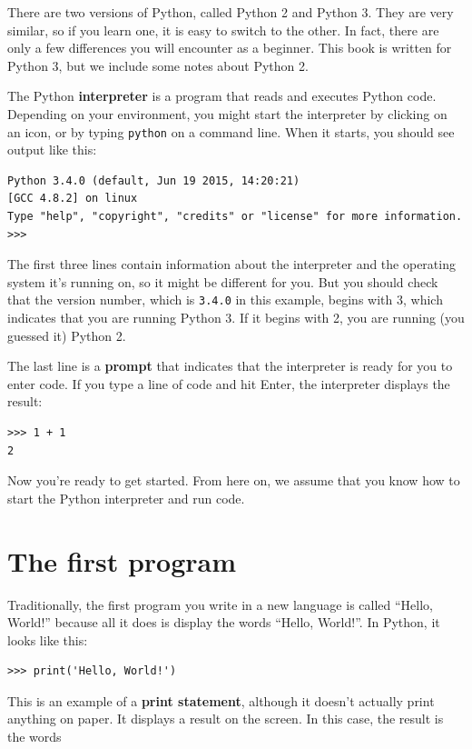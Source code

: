 There are two versions of Python, called Python 2 and Python 3.
They are very similar, so if you learn one, it is easy to switch
to the other. In fact, there are only a few differences you will
encounter as a beginner.
This book is written for Python 3, but we include some notes
about Python 2.

The Python {\bf interpreter} is a program that reads and executes
Python code. Depending on your environment, you might start the
interpreter by clicking on an icon, or by typing {\tt python} on
a command line. 
When it starts, you should see output like this:

\begin{verbatim}
Python 3.4.0 (default, Jun 19 2015, 14:20:21) 
[GCC 4.8.2] on linux
Type "help", "copyright", "credits" or "license" for more information.
>>> 
\end{verbatim}
%
The first three lines contain information about the interpreter
and the operating system it's running on, so it might be different for
you. But you should check that the version number, which is
{\tt 3.4.0} in this example, begins with 3, which indicates that
you are running Python 3. If it begins with 2, you are running
(you guessed it) Python 2.

The last line is a {\bf prompt} that indicates that the interpreter is
ready for you to enter code.
If you type a line of code and hit Enter, the interpreter displays the
result: 

\begin{verbatim}
>>> 1 + 1
2
\end{verbatim}
%
Now you're ready to get started.
From here on, we assume that you know how to start the Python
interpreter and run code.


\section{The first program}
\label{hello}

Traditionally, the first program you write in a new language
is called ``Hello, World!'' because all it does is display the
words ``Hello, World!''. In Python, it looks like this:

\begin{verbatim}
>>> print('Hello, World!')
\end{verbatim}
%
This is an example of a {\bf print statement}, although it
doesn't actually print anything on paper. It displays a result on the
screen. In this case, the result is the words

